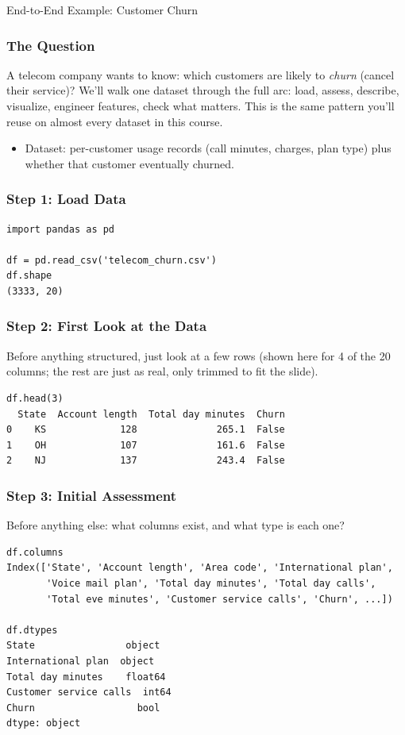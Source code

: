 \begin{frame}
  \begin{center}
    {\Large End-to-End Example: Customer Churn}
  \end{center}
\end{frame}

\begin{frame}[fragile]\frametitle{The Question}
A telecom company wants to know: which customers are likely to \emph{churn} (cancel their
service)? We'll walk one dataset through the full arc: load, assess, describe, visualize,
engineer features, check what matters. This is the same pattern you'll reuse on almost every
dataset in this course.
\begin{itemize}
\item Dataset: per-customer usage records (call minutes, charges, plan type) plus whether
  that customer eventually churned.
\end{itemize}
\end{frame}

\begin{frame}[fragile]\frametitle{Step 1: Load Data}
\begin{lstlisting}
import pandas as pd

df = pd.read_csv('telecom_churn.csv')
df.shape
(3333, 20)
\end{lstlisting}
\end{frame}

\begin{frame}[fragile]\frametitle{Step 2: First Look at the Data}
Before anything structured, just look at a few rows (shown here for 4 of the 20 columns; the
rest are just as real, only trimmed to fit the slide).
\begin{lstlisting}
df.head(3)
  State  Account length  Total day minutes  Churn
0    KS             128              265.1  False
1    OH             107              161.6  False
2    NJ             137              243.4  False
\end{lstlisting}
\end{frame}

\begin{frame}[fragile]\frametitle{Step 3: Initial Assessment}
Before anything else: what columns exist, and what type is each one?
\begin{lstlisting}
df.columns
Index(['State', 'Account length', 'Area code', 'International plan',
       'Voice mail plan', 'Total day minutes', 'Total day calls',
       'Total eve minutes', 'Customer service calls', 'Churn', ...])

df.dtypes
State                object
International plan  object
Total day minutes    float64
Customer service calls  int64
Churn                  bool
dtype: object
\end{lstlisting}
\end{frame}

